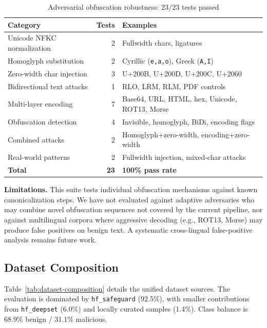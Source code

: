 \documentclass[manuscript,screen,review]{acmart}
\begin{document}
\begin{table}[h]
\caption{Adversarial obfuscation robustness: 23/23 tests passed}
\label{tab:obfuscation}
\centering
\small
\begin{tabular}{lrl}
\toprule
\textbf{Category} & \textbf{Tests} & \textbf{Examples} \\
\midrule
Unicode NFKC normalization & 2 & Fullwidth chars, ligatures \\
Homoglyph substitution & 2 & Cyrillic (\texttt{\selectfont e,a,o}), Greek (\texttt{A,I}) \\
Zero-width char injection & 3 & U+200B, U+200D, U+200C, U+2060 \\
Bidirectional text attacks & 1 & RLO, LRM, RLM, PDF controls \\
Multi-layer encoding & 7 & Base64, URL, HTML, hex, Unicode, ROT13, Morse \\
Obfuscation detection & 4 & Invisible, homoglyph, BiDi, encoding flags \\
Combined attacks & 2 & Homoglyph+zero-width, encoding+zero-width \\
Real-world patterns & 2 & Fullwidth injection, mixed-char attacks \\
\midrule
\textbf{Total} & \textbf{23} & \textbf{100\% pass rate} \\
\bottomrule
\end{tabular}
\end{table}

\textbf{Limitations.} This suite tests individual obfuscation mechanisms against known canonicalization steps. We have not evaluated against adaptive adversaries who may combine novel obfuscation sequences not covered by the current pipeline, nor against multilingual corpora where aggressive decoding (e.g., ROT13, Morse) may produce false positives on benign text. A systematic cross-lingual false-positive analysis remains future work.

\subsection{Dataset Composition}
\label{sec:dataset-composition}

Table~\ref{tab:dataset-composition} details the unified dataset sources. The evaluation is dominated by \texttt{hf\_safeguard} (92.5\%), with smaller contributions from \texttt{hf\_deepset} (6.0\%) and locally curated samples (1.4\%). Class balance is 68.9\% benign / 31.1\% malicious.
\end{document}
